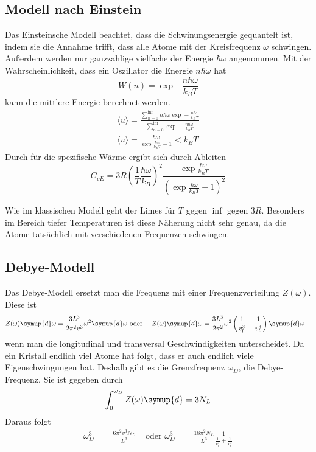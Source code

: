 \subsection{Modell nach Einstein}
Das Einsteinsche Modell beachtet, dass die Schwinungsenergie gequantelt ist, indem sie
die Annahme trifft, dass alle Atome mit der Kreisfrequenz $\omega$ schwingen.
Außerdem werden nur ganzzahlige vielfache der Energie $\hbar\omega$ angenommen.
Mit der Wahrscheinlichkeit, dass ein Oszillator die Energie $n\hbar\omega$ hat
\begin{equation}
  W(n) = \exp{-\frac{n\hbar\omega}{k_BT}}
\end{equation}
kann die mittlere Energie berechnet werden.
\begin{gather}
  \langle u \rangle = \frac{\sum_{n=0}^{\inf} n\hbar\omega \exp-\frac{n\hbar\omega}{k_BT}}{\sum_{n=0}^{\inf} \exp-\frac{n\hbar\omega}{k_BT}} \\
  \langle u \rangle = \frac{\hbar\omega}{\exp\frac{\hbar\omega}{k_B T} - 1} < k_B T
\end{gather}
Durch für die spezifische Wärme ergibt sich durch Ableiten
\begin{equation}
  C_{vE} = 3R \left(\frac{1}{T}\frac{\hbar\omega}{k_B}\right)^2 \frac{\exp{\frac{\hbar\omega}{k_BT}}}{\left(\exp{\frac{\hbar\omega}{k_BT}-1}\right)^2}
\end{equation}

Wie im klassischen Modell geht der Limes für $T$ gegen $\inf$ gegen $3R$.
Besonders im Bereich tiefer Temperaturen ist diese Näherung nicht sehr genau, da die
Atome tatsächlich mit verschiedenen Frequenzen schwingen.

\subsection{Debye-Modell}
Das Debye-Modell ersetzt man die Frequenz mit einer Frequenzverteilung $Z(\omega)$.
Diese ist
\begin{align}
  Z(\omega)\symup{d}\omega  &= \frac{3L^3}{2\pi^2v^3}\omega^2 \symup{d}\omega \text{ oder }& Z(\omega)\symup{d}\omega  &= \frac{3L^3}{2\pi^2}\omega^2 \left( \frac{1}{v_l^3} + \frac{1}{v_t^3}\right) \symup{d}\omega
\end{align}
wenn man die longitudinal und transversal Geschwindigkeiten unterscheidet.
Da ein Kristall endlich viel Atome hat folgt, dass er auch endlich viele Eigenschwingungen hat.
Deshalb gibt es die Grenzfrequenz $\omega_D$, die Debye-Frequenz.
Sie ist gegeben durch
\begin{equation}
  \int_0^{\omega_D} Z(\omega)\symup{d} = 3N_L
\end{equation}
Daraus folgt
\begin{align}
  \omega_D^3 &= \frac{6 \pi^2 v^3 N_L}{L^3} &\text{ oder } \omega_D^3 &= \frac{18 \pi^2  N_L}{L^3} \frac{1}{\frac{1}{v_l^3}+\frac{1}{v_t^3}}
\end{align}

